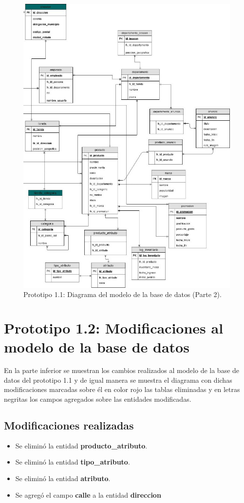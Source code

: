 \FloatBarrier
\begin{figure}[htbp!]
		\centering
			\includegraphics[width=.86 \textwidth]{imagenes/modeloDatos/TT_database1_1_parte2}
		\caption{Prototipo 1.1: Diagrama del modelo de la base de datos (Parte 2).}
		\label{image:prototipo11basededatos3}
\end{figure}
\FloatBarrier


\section{Prototipo 1.2: Modificaciones al modelo de la base de datos}
En la parte inferior se muestran los cambios realizados al modelo de la base de datos del prototipo 1.1 y de igual manera se muestra el diagrama con dichas modificaciones marcadas sobre él en color rojo las tablas eliminadas y en letras negritas los campos agregados sobre las entidades modificadas.
\\ \par
\subsection{Modificaciones realizadas}
\begin{itemize}
\item Se eliminó la entidad \textbf{producto\_atributo}. 
\item Se eliminó la entidad \textbf{tipo\_atributo}. 
\item Se eliminó la entidad \textbf{atributo}. 
\item Se agregó el campo \textbf{calle} a la entidad \textbf{direccion}
\end{itemize}
